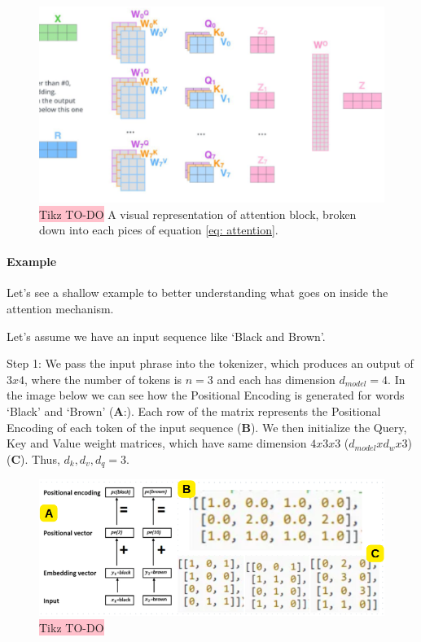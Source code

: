 \begin{figure}[H]
    \centering
    \includegraphics[width=\linewidth]{tikz/Attention block breakdown.png}
    \caption{{\color{red}\colorbox{pink}{Tikz TO-DO}} A visual representation of attention block, broken down into each pices of equation \ref{eq: attention}.}
    \label{fig:attention-block-breakdown}
\end{figure}


\paragraph{Example}

Let's see a shallow example to better understanding what goes on inside the attention mechanism.

Let's assume we have an input sequence like ‘Black and Brown’.

Step 1: We pass the input phrase into the tokenizer, which produces an output of $3x4$, where the number of tokens is $n=3$ and each has dimension $d_{model} = 4$. In the image below we can see how the Positional Encoding is generated for words ‘Black’ and ‘Brown’ (\textbf{A}:). Each row of the matrix represents the Positional Encoding of each token of the input sequence (\textbf{B}). We then initialize the  Query, Key and Value weight matrices, which have same dimension $4x3x3$ ($d_{model} x d_{w}x 3$)(\textbf{C}). Thus, $d_k,d_v, d_q = 3$.

\begin{figure}[H]
    \centering
    \includegraphics[width=\linewidth]{tikz/Attention Example 1.png}
    \caption{{\color{red}\colorbox{pink}{Tikz TO-DO}} }
    \label{fig:transformer-input-embedding}
\end{figure}


